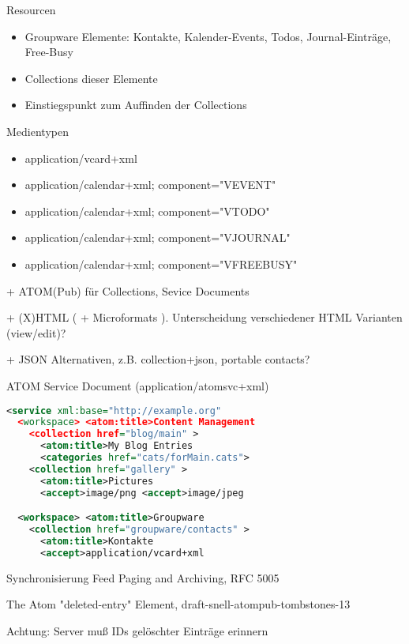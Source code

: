\documentclass{beamer}
\begin{document}
\begin{frame}{Resourcen}
  \begin{itemize}
  \item Groupware Elemente: Kontakte, Kalender-Events, Todos, Journal-Einträge, Free-Busy
  \item Collections dieser Elemente
  \item Einstiegspunkt zum Auffinden der Collections
  \end{itemize}
\end{frame}

\begin{frame}{Medientypen}
  \begin{itemize}
  \item   application/vcard+xml
  \item   application/calendar+xml; component="VEVENT"
  \item   application/calendar+xml; component="VTODO"
  \item   application/calendar+xml; component="VJOURNAL"
  \item   application/calendar+xml; component="VFREEBUSY"
  \end{itemize}
  + ATOM(Pub) für Collections, Sevice Documents

  + (X)HTML ( +  Microformats ). Unterscheidung verschiedener HTML Varianten (view/edit)?

  + JSON Alternativen, z.B. collection+json, portable contacts? 
\end{frame}

\begin{frame}[fragile]{ATOM Service Document (application/atomsvc+xml)} 
  \begin{lstlisting}[language=xml]
<service xml:base="http://example.org"
  <workspace> <atom:title>Content Management
    <collection href="blog/main" >
      <atom:title>My Blog Entries
      <categories href="cats/forMain.cats">
    <collection href="gallery" >
      <atom:title>Pictures
      <accept>image/png <accept>image/jpeg

  <workspace> <atom:title>Groupware
    <collection href="groupware/contacts" >
      <atom:title>Kontakte
      <accept>application/vcard+xml

  \end{lstlisting}
\end{frame}

\begin{frame}{Synchronisierung}
  Feed Paging and Archiving, RFC 5005

  The Atom "deleted-entry" Element, draft-snell-atompub-tombstones-13

  Achtung: Server muß IDs gelöschter Einträge erinnern
\end{frame}
\end{document}
